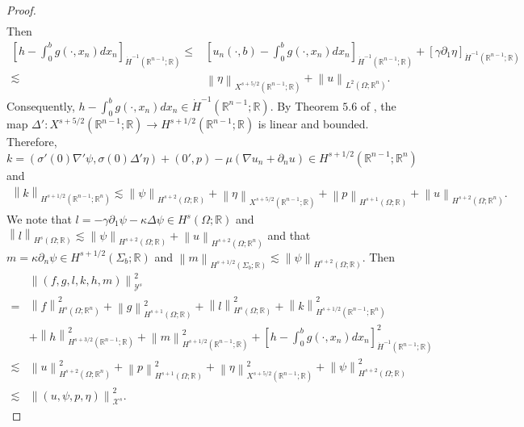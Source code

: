\documentclass[11pt,letterpaper,reqno]{amsart}
\numberwithin{equation}{section}
\newcommand{\norm}[1]{\left\lVert#1\right\rVert}
\begin{document}
\begin{proof}
\begin{align}
    \end{align}
    Then
    \begin{align}
        \left[h-\int_{0}^{b}g(\cdot,x_{n})dx_{n}\right]_{\dot{H}^{-1}(\mathbb{R}^{n-1};\mathbb{R})} \leq& \left[u_{n}(\cdot,b)-\int_{0}^{b}g(\cdot,x_{n})dx_{n}\right]_{\dot{H}^{-1}(\mathbb{R}^{n-1};\mathbb{R})}+\left[\gamma\partial_{1}\eta\right]_{\dot{H}^{-1}(\mathbb{R}^{n-1};\mathbb{R})} \nonumber\\
        \lesssim &\norm{\eta}_{X^{s+5/2}(\mathbb{R}^{n-1};\mathbb{R})}+\norm{u}_{L^{2}(\Omega;\mathbb{R}^{n})}.
    \end{align}
    Consequently, \(h-\int_{0}^{b}g(\cdot,x_{n})dx_{n} \in \dot{H}^{-1}(\mathbb{R}^{n-1};\mathbb{R})\). By Theorem \(5.6\) of \cite{leoni2023traveling}, the map \(\Delta': X^{s+5/2}(\mathbb{R}^{n-1};\mathbb{R}) \to H^{s+1/2}(\mathbb{R}^{n-1};\mathbb{R})\) is linear and bounded. Therefore, \(k=(\sigma'(0)\nabla'\psi,\sigma(0)\Delta'\eta)+(0',p)-\mu(\nabla u_{n}+\partial_{n}u)\in H^{s+1/2}(\mathbb{R}^{n-1};\mathbb{R}^{n})\) and
    \begin{align}
        \norm{k}_{H^{s+1/2}(\mathbb{R}^{n-1};\mathbb{R}^{n})} \lesssim \norm{\psi}_{H^{s+2}(\Omega;\mathbb{R})}+\norm{\eta}_{X^{s+5/2}(\mathbb{R}^{n-1};\mathbb{R})}+\norm{p}_{H^{s+1}(\Omega;\mathbb{R})}+\norm{u}_{H^{s+2}(\Omega;\mathbb{R}^{n})}.
    \end{align}
    We note that \(l=-\gamma\partial_{1}\psi-\kappa\Delta\psi \in H^{s}(\Omega;\mathbb{R})\) and \(\norm{l}_{H^{s}(\Omega;\mathbb{R})} \lesssim \norm{\psi}_{H^{s+2}(\Omega;\mathbb{R})}+\norm{u}_{H^{s+2}(\Omega;\mathbb{R}^{n})}\) and that \(m=\kappa\partial_{n}\psi \in H^{s+1/2}(\Sigma_{b};\mathbb{R})\) and \(\norm{m}_{H^{s+1/2}(\Sigma_{b};\mathbb{R})} \lesssim \norm{\psi}_{H^{s+2}(\Omega;\mathbb{R})}\). Then
    \begin{align}
        &\norm{(f,g,l,k,h,m)}_{\mathcal{Y}^{s}}^{2} \nonumber \\
        =&\norm{f}^{2}_{H^{s}(\Omega;\mathbb{R}^{n})}+\norm{g}^{2}_{H^{s+1}(\Omega;\mathbb{R})}+\norm{l}^{2}_{H^{s}(\Omega;\mathbb{R})}+\norm{k}^{2}_{H^{s+1/2}(\mathbb{R}^{n-1};\mathbb{R}^{n})} \nonumber \\
        &+\norm{h}^{2}_{H^{s+3/2}(\mathbb{R}^{n-1};\mathbb{R})}+\norm{m}^{2}_{H^{s+1/2}(\mathbb{R}^{n-1};\mathbb{R})}+\left[h-\int_{0}^{b}g(\cdot,x_{n})dx_{n}\right]_{\dot{H}^{-1}(\mathbb{R}^{n-1};\mathbb{R})}^{2} \nonumber \\
        \lesssim&\norm{u}_{H^{s+2}(\Omega;\mathbb{R}^{n})}^{2}+\norm{p}_{H^{s+1}(\Omega;\mathbb{R})}^{2}+\norm{\eta}_{X^{s+5/2}(\mathbb{R}^{n-1};\mathbb{R})}^{2}+\norm{\psi}_{H^{s+2}(\Omega;\mathbb{R})}^{2} \nonumber \\
        \lesssim&\norm{(u,\psi,p,\eta)}_{\mathcal{X}^{s}}^{2}.
    \end{align}
\end{proof}
\end{document}
